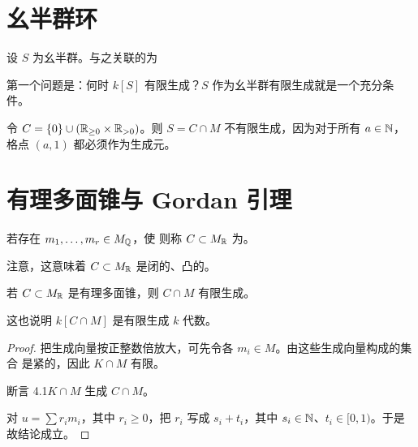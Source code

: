 \section{幺半群环}
\begin{definition}\label{def:4.2}
设 $S$ 为幺半群。与之关联的为
\end{definition}
第一个问题是：何时 $k[S]$ 有限生成？$S$ 作为幺半群有限生成就是一个充分条件。
\begin{example}\label{ex:4.3}
令 $C=\{0\}\cup(\mathbb R_{\ge0}\times\mathbb R_{>0})$。则 $S=C\cap M$ 不有限生成，因为对于所有 $a\in\mathbb N$，格点 $(a,1)$ 都必须作为生成元。
\end{example}
\section{有理多面锥与 Gordan 引理}
\begin{definition}\label{def:4.3}
若存在 $m_1,\ldots,m_r\in M_{\mathbb Q}$，使
则称 $C\subset M_{\mathbb R}$ 为。
\end{definition}
注意，这意味着 $C\subset M_{\mathbb R}$ 是闭的、凸的。
\begin{proposition}[Gordan 引理]\label{prop:4.2}
若 $C\subset M_{\mathbb R}$ 是有理多面锥，则 $C\cap M$ 有限生成。
\end{proposition}
这也说明 $k[C\cap M]$ 是有限生成 $k$ 代数。
\begin{proof}
把生成向量按正整数倍放大，可先令各 $m_i\in M$。由这些生成向量构成的集合
是紧的，因此 $K\cap M$ 有限。
\begin{custom}{断言 4.1}\hypertarget{claim:4.1}{}$K\cap M$ 生成 $C\cap M$。\end{custom}
对 $u=\sum r_im_i$，其中 $r_i\ge0$，把 $r_i$ 写成 $s_i+t_i$，其中 $s_i\in\mathbb N$、$t_i\in[0,1)$。于是
故结论成立。
\end{proof}
